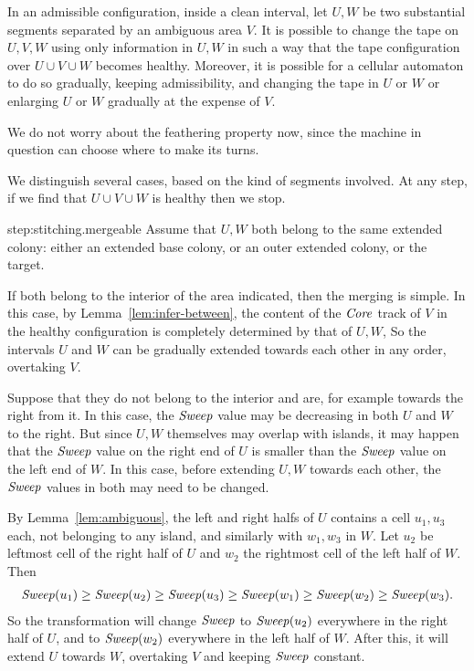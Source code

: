 \documentclass[11pt]{memoir}
\theoremstyle{definition} %
\renewcommand{\ge}{\geq}
\newcommand{\fld}[1]{\ensuremath{\textit{#1\/}}}
\newcommand{\Core}{\fld{Core}}
\newcommand{\Sweep}{\fld{Sweep}}
\begin{document}
\begin{lemma}[Stitching]\label{lem:stitching}
In an admissible configuration, inside a clean interval,
let \( U,W \) be two substantial segments separated by an ambiguous area \( V \).
It is possible to change the tape on \( U,V,W \) using only information in \( U,W \) in such a 
way that the tape configuration over \( U\cup V\cup W \) becomes healthy.
Moreover, it is possible for a cellular automaton to do so gradually, keeping admissibility, and
changing the tape in \( U \) or \( W \) or enlarging \( U \) or \( W \)
gradually at the expense of \( V \).
\end{lemma}
We do not worry about the feathering property now, since the machine in question can choose
where to make its turns.
\begin{Proof}
We distinguish several cases, based on the kind of segments involved.
At any step, if we find that \( U\cup V\cup W \) is healthy then we stop.
\begin{step+}{step:stitching.mergeable}
Assume that \( U,W \) both belong to the same extended colony: either an extended base colony, or 
an outer extended colony, or the target.
\end{step+}
\begin{prooof}
If both belong to the interior of the area indicated, then the merging is simple.
In this case, by Lemma~\ref{lem:infer-between}, the content of the \( \Core \) track 
of \( V \) in the healthy configuration is completely determined by that of \( U,W \),
So the intervals \( U \) and \( W \) can be gradually extended towards each other in any order, 
overtaking \( V \).

Suppose that they do not belong to the interior and are, for example towards the right from it.
In this case, the \( \Sweep \) value may be decreasing in both \( U \) and \( W \) to the right.
But since \( U,W \) themselves may overlap with islands, it may happen that the \( \Sweep \) value
on the right end of \( U \) is smaller than the \( \Sweep \) value on the left end of \( W \).
In this case, before extending \( U,W \) towards each other, the \( \Sweep \) values in both
may need to be changed.

By Lemma~\ref{lem:ambiguous}, the left and right halfs of \( U \) contains a cell \( u_{1},u_{3} \) 
each, not belonging to any island, and similarly with \( w_{1},w_{3} \) in \( W \).
Let \( u_{2} \) be leftmost cell of the right half of \( U \) and \( w_{2} \) the rightmost cell of the left 
half of \( W \).
Then
\begin{align*}
 \Sweep(u_{1})\ge \Sweep(u_{2})\ge \Sweep(u_{3})\ge \Sweep(w_{1})\ge \Sweep(w_{2})\ge \Sweep(w_{3}).   
 \end{align*}
So the transformation will change \( \Sweep \) to \( \Sweep(u_{2}) \) everywhere in the right half of \( U \),
and to \( \Sweep(w_{2}) \) everywhere in the left half of \( W \).
After this, it will extend \( U \) towards \( W \), overtaking \( V \) and keeping \( \Sweep \) constant.


\end{prooof}
\end{Proof}
\end{document}
